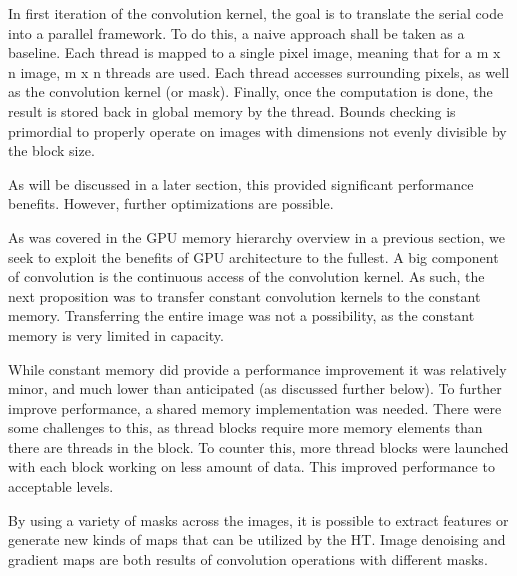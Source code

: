 \documentclass[conference]{IEEEtran}
\begin{document}
In first iteration of the convolution kernel, the goal is to translate the serial code into a parallel framework. To do this, a naive approach shall be taken as a baseline. Each thread is mapped to a single pixel image, meaning that for a m x n image, m x n threads are used. Each thread accesses surrounding pixels, as well as the convolution kernel (or mask). Finally, once the computation is done, the result is stored back in global memory by the thread. Bounds checking is primordial to properly operate on images with dimensions not evenly divisible by the block size.

As will be discussed in a later section, this provided significant performance benefits. However, further optimizations are possible.

As was covered in the GPU memory hierarchy overview in a previous section, we seek to exploit the benefits of GPU architecture to the fullest. A big component of convolution is the continuous access of the convolution kernel. As such, the next proposition was to transfer constant convolution kernels to the constant memory. Transferring the entire image was not a possibility, as the constant memory is very limited in capacity.

While constant memory did provide a performance improvement it was relatively minor, and much lower than anticipated (as discussed further 
 below). To further improve performance,  a shared memory implementation was needed. There were some challenges to this, as thread blocks require more memory elements than there are threads in the block. To counter this, more thread blocks were launched with each block working on less amount of data. This improved performance to acceptable levels.


By using a variety of masks across the images, it is possible to extract features or generate new kinds of maps that can be utilized by the HT\@.
Image denoising and gradient maps are both results of convolution operations with different masks.
\end{document}
